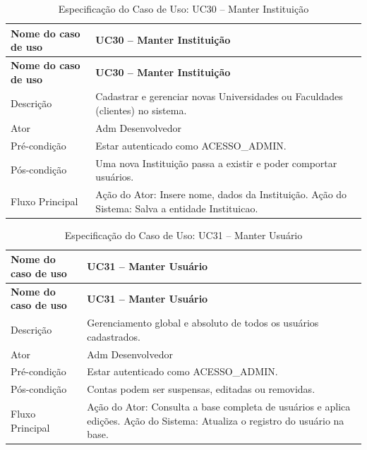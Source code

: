 \fonteautores

\vspace{\baselineskip}

\Needspace{0.48\textheight}
\begin{longtable}{|L{4.5cm}|L{10.5cm}|}
\caption{Especificação do Caso de Uso: UC30 -- Manter Instituição} \\
\hline
\textbf{Nome do caso de uso} & \textbf{UC30 -- Manter Instituição} \\
\hline
\endfirsthead
\hline
\textbf{Nome do caso de uso} & \textbf{UC30 -- Manter Instituição} \\
\hline
\endhead
Descrição       & Cadastrar e gerenciar novas Universidades ou Faculdades (clientes) no sistema. \\
\hline
Ator            & Adm Desenvolvedor \\
\hline
Pré-condição    & Estar autenticado como ACESSO\_ADMIN. \\
\hline
Pós-condição    & Uma nova Instituição passa a existir e poder comportar usuários. \\
\hline
Fluxo Principal & Ação do Ator: Insere nome, dados da Instituição. Ação do Sistema: Salva a entidade Instituicao. \\
\hline
\end{longtable}

\fonteautores

\vspace{\baselineskip}

\Needspace{0.48\textheight}
\begin{longtable}{|L{4.5cm}|L{10.5cm}|}
\caption{Especificação do Caso de Uso: UC31 -- Manter Usuário} \\
\hline
\textbf{Nome do caso de uso} & \textbf{UC31 -- Manter Usuário} \\
\hline
\endfirsthead
\hline
\textbf{Nome do caso de uso} & \textbf{UC31 -- Manter Usuário} \\
\hline
\endhead
Descrição       & Gerenciamento global e absoluto de todos os usuários cadastrados. \\
\hline
Ator            & Adm Desenvolvedor \\
\hline
Pré-condição    & Estar autenticado como ACESSO\_ADMIN. \\
\hline
Pós-condição    & Contas podem ser suspensas, editadas ou removidas. \\
\hline
Fluxo Principal & Ação do Ator: Consulta a base completa de usuários e aplica edições. Ação do Sistema: Atualiza o registro do usuário na base. \\
\hline
\end{longtable}

